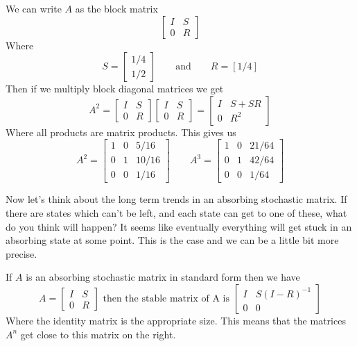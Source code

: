 \documentclass[14,fleqn]{article}
\begin{document}
We can write $A$ as the block matrix
\[
	\left[ \begin{array}{c|c}I&S\\\hline0&R\end{array}\right]
\]
Where
\[
	S=\begin{bmatrix}1/4\\1/2\end{bmatrix}\qquad \text{and}\qquad R=\left[1/4\right]
\]
Then if we multiply block diagonal matrices we get
\[
	A^2=\left[ \begin{array}{c|c}I&S\\\hline0&R\end{array}\right]\left[ \begin{array}{c|c}I&S\\\hline0&R\end{array}\right]=\left[ \begin{array}{c|c}I&S+SR\\\hline0&R^2\end{array}\right]
\]
Where all products are matrix products. This gives us
\[
	A^2=\begin{bmatrix}1&0&5/16\\0&1&10/16\\0&0&1/16\end{bmatrix}\qquad A^3=\begin{bmatrix}1&0&21/64\\0&1&42/64\\0&0&1/64\end{bmatrix}
\]	

Now let's think about the long term trends in an absorbing stochastic matrix. If there are states which can't be left, and each state can get to one of these, what do you think will happen? It seems like eventually everything will get stuck in an absorbing state at some point. This is the case and we can be a little bit more precise.

If $A$ is an absorbing stochastic matrix in standard form then we have 
\[
	A=\left[\begin{array}{c|c}  I&S\\\hline 0&R\end{array}\right]\text{ then the stable matrix of A is } \left[\begin{array}{c|c}  I&S(I-R)^{-1}\\\hline 0&0\end{array}\right]
\]
Where the identity matrix is the appropriate size. This means that the matrices $A^n$ get close to this matrix on the right. 
\end{document}
